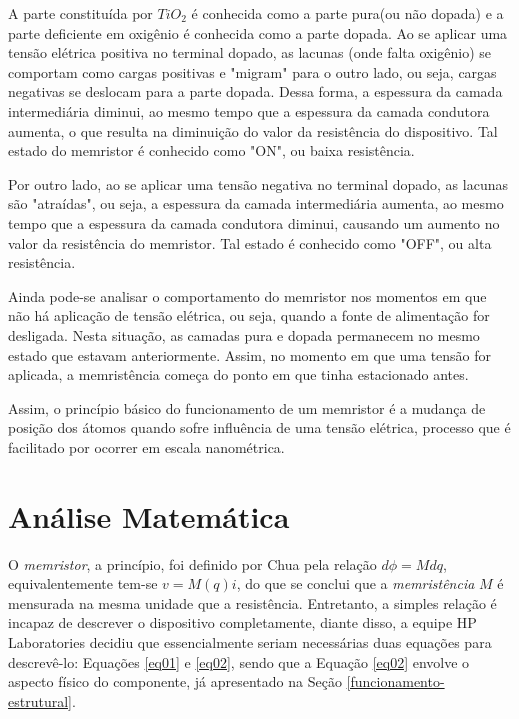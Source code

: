 \documentclass{ceel}
\begin{document}
\begin{multicols}{2}
A parte constituída por $TiO_2$ é conhecida como a parte pura(ou não dopada) e a parte deficiente em oxigênio é conhecida como a parte dopada. Ao se aplicar uma tensão elétrica positiva no terminal dopado, as lacunas (onde falta oxigênio) se comportam como cargas positivas e "migram" para o outro lado, ou seja, cargas negativas se deslocam para a parte dopada. Dessa forma, a espessura da camada intermediária diminui, ao mesmo tempo que a espessura da camada condutora aumenta, o que resulta na diminuição do valor da resistência do dispositivo. Tal estado do memristor é conhecido como "ON", ou baixa resistência. %

Por outro lado, ao se aplicar uma tensão negativa no terminal dopado, as lacunas são "atraídas", ou seja, a espessura da camada intermediária aumenta, ao mesmo tempo que a espessura da camada condutora diminui, causando um aumento no valor da resistência do memristor. Tal estado é conhecido como "OFF", ou alta resistência. 

Ainda pode-se analisar o comportamento do memristor nos momentos em que não há aplicação de tensão elétrica, ou seja, quando a fonte de alimentação for desligada. Nesta situação, as camadas pura e dopada permanecem no mesmo estado que estavam anteriormente. Assim, no momento em que uma tensão for aplicada, a memristência começa do ponto em que tinha estacionado antes. %

Assim, o princípio básico do funcionamento de um memristor é a mudança de posição dos átomos quando sofre influência de uma tensão elétrica, processo que é facilitado por ocorrer em escala nanométrica. %

\section{Análise Matemática}\label{analise-matematica}
O \emph{memristor}, a princípio, foi definido por Chua pela relação $d\phi=M dq$, equivalentemente tem-se $v=M(q)i$, do que se conclui que a \emph{memristência} $M$ é mensurada na mesma unidade que a resistência. Entretanto, a simples relação é incapaz de descrever o dispositivo completamente, diante disso, a equipe HP Laboratories decidiu que essencialmente seriam necessárias duas equações para descrevê-lo: Equações \ref{eq01} e \ref{eq02}, sendo que a Equação \ref{eq02} envolve o aspecto físico do componente, já apresentado na Seção \ref{funcionamento-estrutural}.


\end{multicols}
\end{document}
